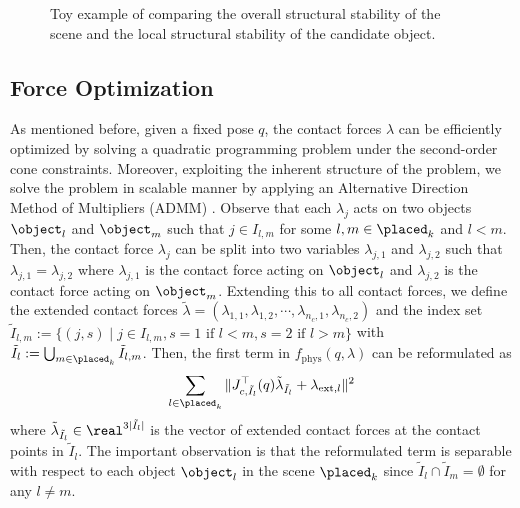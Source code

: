 \begin{figure}[t]
  \centering
  \caption{Toy example of comparing the overall structural stability of the scene and the local structural stability of the candidate object.}
  \label{fig:overview}
\end{figure}

\subsection{Force Optimization}
As mentioned before, given a fixed pose $q$, the contact forces $\lambda$ can be efficiently optimized by solving a quadratic programming problem under the second-order cone constraints.
Moreover, exploiting the inherent structure of the problem, we solve the problem in scalable manner by applying an Alternative Direction Method of Multipliers (ADMM) \cite{}.
Observe that each $\lambda_j$ acts on two objects $\object_l$ and $\object_m$ such that $j \in I_{l,m}$ for some $l, m \in \placed_k$ and $l < m$.
Then, the contact force $\lambda_j$ can be split into two variables $\lambda_{j,1}$ and $\lambda_{j,2}$ such that $\lambda_{j,1} = \lambda_{j,2}$ where $\lambda_{j,1}$ is the contact force acting on $\object_l$ and $\lambda_{j,2}$ is the contact force acting on $\object_m$.
Extending this to all contact forces, we define the extended contact forces $\tilde{\lambda} = (\lambda_{1,1},\lambda_{1,2},\cdots,\lambda_{n_c,1},\lambda_{n_c,2})$ and the index set $\tilde{I}_{l,m} := \{(j,s) \mid j \in I_{l,m}, s = 1 \text{ if $l < m$}, s = 2 \text{ if $l > m$}\}$ with $\tilde{I}_{l} := \bigcup_{m \in \placed_k} \tilde{I}_{l,m}$.
Then, the first term in $f_\text{phys}(q,\lambda)$ can be reformulated as 
\begin{equation*}
  \sum_{l \in \placed_k} \|J_{c,\tilde{I}_l}^\top(q)  \tilde{\lambda}_{\tilde{I}_l} + \lambda_{\text{ext},l}\|^2
\end{equation*}
where $\tilde{\lambda}_{\tilde{I}_l} \in \real^{3|\tilde{I}_l|}$ is the vector of extended contact forces at the contact points in $\tilde{I}_l$.
The important observation is that the reformulated term is separable with respect to each object $\object_l$ in the scene $\placed_k$ since $\tilde{I}_l \cap \tilde{I}_m = \emptyset$ for any $l \neq m$.
